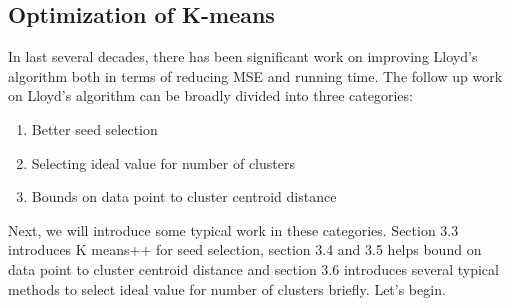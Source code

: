 \documentclass[11pt]{article}
\begin{document}
\subsection{Optimization of K-means}
In last several decades, there has been significant work on improving Lloyd's algorithm both in terms of reducing MSE and running time. The follow up
work on Lloyd's algorithm can be broadly divided into three categories:
\begin{enumerate}
\item Better seed selection
\item Selecting ideal value for number of clusters
\item Bounds on data point to cluster centroid distance
\end{enumerate}
Next, we will introduce some typical work in these categories. Section 3.3 introduces K means++ for seed selection, section 3.4 and 3.5 helps bound on data point to cluster centroid distance and section 3.6 introduces several typical methods to select ideal value for number of clusters briefly. Let's begin.


\end{document}
